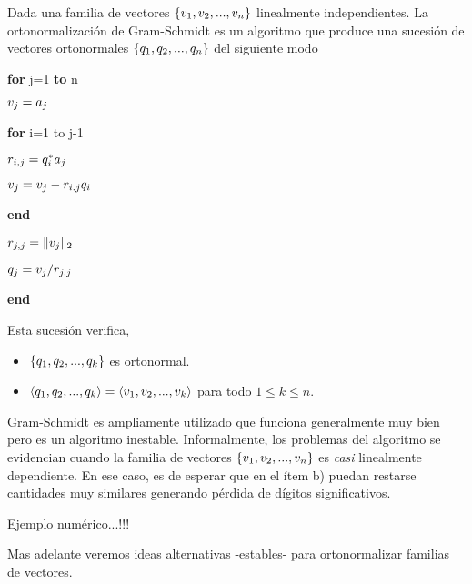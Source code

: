 \begin{tcolorbox}
Dada una familia de vectores $\{\vb_1, \vb_2, ...,\vb_n\}$ linealmente independientes. La ortonormalización de Gram-Schmidt
es un algoritmo que produce una sucesión de vectores ortonormales  $\{\qb_1,\qb_2,...,\qb_n\}$ del siguiente modo

\begin{tcolorbox}[width=\linewidth/3]
{\bf for} j=1 {\bf to} n

$\vb_j=\ab_j$

{\bf for} i=1 to j-1

$r_{i,j}=\qb_i^*\ab_j$

 $\vb_j=\vb_j-r_{i.j}
\qb_i$

{\bf end}

$r_{j,j}=\|\vb_j\|_2$

$\qb_{j}=\vb_j/r_{j,j}$

{\bf end}
\end{tcolorbox}


Esta sucesión verifica,
\begin{itemize}
 \item $\{\qb_1,\qb_2,...,\qb_k\}$ es ortonormal.
 \item $\langle\qb_1,\qb_2,...,\qb_k\rangle=\langle\vb_1,\vb_2,..., \vb_k\rangle$ para todo $1\le k\le n$.
\end{itemize}

\begin{tcolorbox}
\begin{rem}
Gram-Schmidt es ampliamente utilizado que funciona generalmente muy bien pero es un algoritmo inestable. Informalmente, los problemas del algoritmo se evidencian cuando la familia de vectores $\{\vb_1, \vb_2, ...,\vb_n\}$ es \emph{casi} linealmente dependiente. En ese caso, es de esperar que en el ítem
b) puedan restarse cantidades muy similares generando pérdida de dígitos significativos.

Ejemplo numérico...!!!

Mas adelante veremos ideas alternativas -estables- para ortonormalizar familias de vectores.

\end{rem}


\end{tcolorbox}
\end{tcolorbox}
